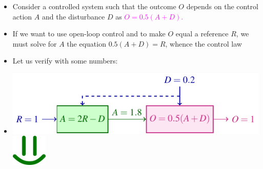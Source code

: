 \begin{frame}
\myPause
 \begin{itemize}[<+-| alert@+>]
 \item \vspace{-8mm}Consider a controlled system such that the outcome $O$ depends on the control action $A$ and
       the disturbance $D$ as \textcolor{magenta}{$O=0.5(A+D)$.}
 \item If we want to use open-loop control and to make $O$ equal a reference $R$, we must solve for $A$ the equation
       $0.5(A+D)=R$, whence the control law 
 \item Let us verify with some numbers:
 \item[] \begin{center}
          \includegraphics[width=0.60\columnwidth]{./Unit-02/img/Taxonomy-OpenLoop-Example-FullKnowledge.pdf}
          \hspace{6mm}\includegraphics[height=1.5cm]{./Unit-02/img/smile.png}
         \end{center}
 \end{itemize}
\end{frame}

